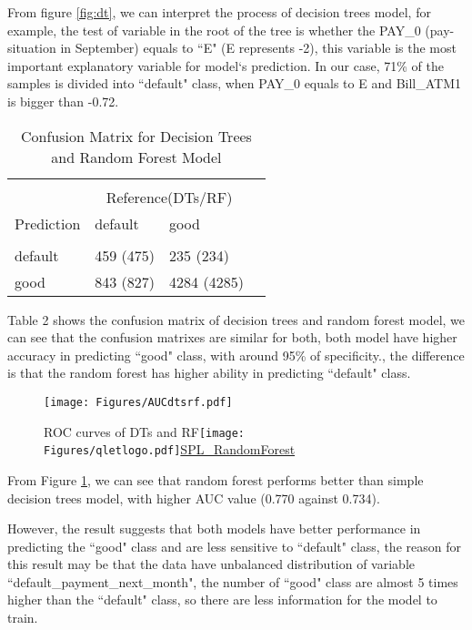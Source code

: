 \documentclass[a4paper,11pt]{article}
\begin{document}
From figure \ref{fig:dt}, we can interpret the process of decision trees model, for example, the test of variable in the root of the tree is whether the PAY\_0 (pay-situation in September) equals to ``E" (E represents -2), this variable is the most important explanatory variable for model`s prediction. In our case, 71\% of the samples is divided into ``default" class, when PAY\_0 equals to E and Bill\_ATM1 is bigger than -0.72.  
 \begin{center}
 	\begin{table}[!ht]
 		\centering  
 		\begin{tabular}{l|llc}
 			\hline\hline\\
 			& \multicolumn{2}{c}{Reference(DTs/RF)} \\		
 			Prediction & default   &    good \\			
 			\hline \\[-1.8ex] 			
 			default & 459 (475)    &   235 (234) \\ 					
 			good & 843 (827)    &   4284  (4285)\\ 			
 			\hline \hline			
 		\end{tabular}  
 		\caption{Confusion Matrix for Decision Trees and Random Forest Model} 	
 	\end{table}	
 \end{center}
Table 2 shows the confusion matrix of decision trees and random forest model, we can see that the confusion matrixes are similar for both, both model have higher accuracy in predicting ``good" class, with around 95\% of specificity., the difference is that the random forest has higher ability in predicting ``default" class.
 \begin{figure}[!ht] 
	\centering\texttt{[image: Figures/AUCdtsrf.pdf]} 
	\caption{ROC curves of DTs and RF\protect\texttt{[image: Figures/qletlogo.pdf]}\href{https://github.com/Jingmin24/R-programming/tree/master/SPL_RandomForest}{SPL\_RandomForest}}\label{fig:rocdtrf} 
\end{figure}

From Figure \ref{fig:rocdtrf}, we can see that random forest performs better than simple decision trees model, with higher AUC value (0.770 against 0.734).

However, the result suggests that both models have better performance in predicting the ``good" class and are less sensitive to ``default" class, the reason for this result may be that the data have unbalanced distribution of variable ``default\_payment\_next\_month", the number of ``good" class are almost 5 times higher than the ``default" class, so there are less information for the model to train.
\end{document}
